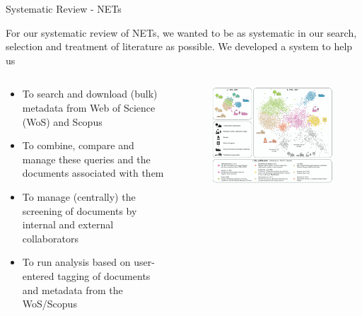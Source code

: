 \documentclass[9pt]{beamer}
\begin{document}
\begin{frame}{Systematic Review - NETs}

For our systematic review of NETs, we wanted to be as systematic in our search, selection and treatment of literature as possible. We developed a system to help us

\begin{columns}
	\begin{column}{0.5\linewidth}
		\begin{itemize}
			\item To search and download (bulk) metadata from Web of Science (WoS) and Scopus
			\item To combine, compare and manage these queries and the documents associated with them
			\item To manage (centrally) the screening of documents by internal and external collaborators
			\item To run analysis based on user-entered tagging of documents and metadata from the WoS/Scopus
		\end{itemize}
	\end{column}
	\begin{column}{0.5\linewidth}
		\begin{figure}
			\includegraphics[width=\linewidth]{images/NETs_network}
			\caption{\citep{Minx2017a}}
		\end{figure}
	\end{column}
\end{columns}

\end{frame}
\end{document}
